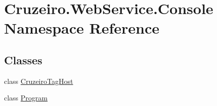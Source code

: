 \hypertarget{namespace_cruzeiro_1_1_web_service_1_1_console}{}\section{Cruzeiro.\+Web\+Service.\+Console Namespace Reference}
\label{namespace_cruzeiro_1_1_web_service_1_1_console}
\subsection*{Classes}
\begin{DoxyCompactItemize}
\item 
class \hyperlink{class_cruzeiro_1_1_web_service_1_1_console_1_1_cruzeiro_tag_host}{Cruzeiro\+Tag\+Host}
\item 
class \hyperlink{class_cruzeiro_1_1_web_service_1_1_console_1_1_program}{Program}
\end{DoxyCompactItemize}
